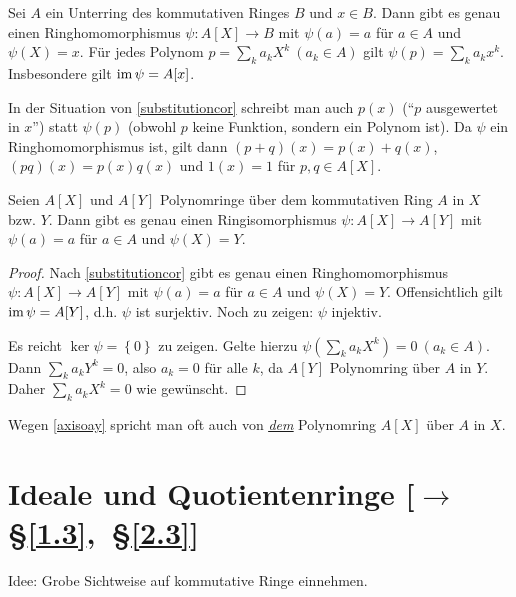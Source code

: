 \documentclass[../../main.tex]{subfiles}
\begin{document}
\begin{kor}\label{substitutioncor}
Sei $A$ ein Unterring des kommutativen Ringes $B$ und $x\in B$. Dann gibt es genau einen Ringhomomorphismus $\psi:A[X]\to B$ mit $\psi(a)=a$ für $a\in A$ und $\psi(X)=x$. Für jedes Polynom $p=\sum_ka_kX^k~(a_k\in A)$ gilt $\psi(p)=\sum_ka_kx^k$. Insbesondere gilt $\operatorname{im}\psi=A[x]$.
\end{kor}

\begin{nt}\label{writepx}
In der Situation von \ref{substitutioncor} schreibt man auch $p(x)$ ("`$p$ ausgewertet in $x$"') statt $\psi(p)$ (obwohl $p$ keine Funktion, sondern ein Polynom ist).
Da $\psi$ ein Ringhomomorphismus ist, gilt dann $(p+q)(x)=p(x)+q(x)$, $(pq)(x)=p(x)q(x)$ und $1(x)=1$ für $p,q\in A[X]$.
\end{nt}

\begin{sat}\label{axisoay}
Seien $A[X]$ und $A[Y]$ Polynomringe über dem kommutativen Ring $A$ in $X$ bzw. $Y$. Dann gibt es genau einen Ringisomorphismus $\psi:A[X]\to A[Y]$ mit $\psi(a)=a$ für $a\in A$ und $\psi(X)=Y$.
\end{sat}
\begin{proof}
Nach \ref{substitutioncor} gibt es genau einen Ringhomomorphismus $\psi:A[X]\to A[Y]$ mit $\psi(a)=a$ für $a\in A$ und $\psi(X)=Y$. Offensichtlich gilt $\operatorname{im} \psi = A[Y]$, d.h. $\psi$ ist surjektiv. Noch zu zeigen: $\psi$ injektiv.

Es reicht $\ker\psi=\left\{0\right\}$ zu zeigen. Gelte hierzu $\psi\left(\sum_k a_k X^k\right)=0 ~(a_k\in A)$. Dann $\sum_k a_k Y^k=0$, also $a_k=0$ für alle $k$, da $A[Y]$ Polynomring über $A$ in $Y$. Daher $\sum_k a_kX^k=0$ wie gewünscht.
\end{proof}

\begin{spr}\label{thepolynomialring}
Wegen \ref{axisoay} spricht man oft auch von \emph{\underline{\underline{dem}}} Polynomring $A[X]$ über $A$ in $X$.
\end{spr}

\section[tocentry={Ideale und Quotientenringe}]{Ideale und Quotientenringe {\small [$\to$ §\ref{1.3},~§\ref{2.3}]}}\label{3.3}

\noindent
Idee: Grobe Sichtweise auf kommutative Ringe einnehmen.
\end{document}
